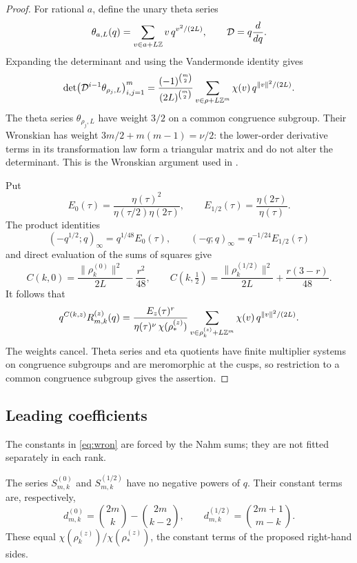 \begin{proof}
For rational $a$, define the unary theta series
\[
\theta_{a,L}(q)=\sum_{v\in a+L\mathbb{Z}}v\,q^{v^2/(2L)},\qquad \mathcal D=q\frac{d}{dq}.
\]
Expanding the determinant and using the Vandermonde identity gives
\[
\det\bigl(\mathcal D^{i-1}\theta_{\rho_j,L}\bigr)_{i,j=1}^m=\frac{(-1)^{\binom m2}}{(2L)^{\binom m2}}\sum_{v\in\rho+L\mathbb{Z}^m}\chi(v)\,q^{\|v\|^2/(2L)}.
\]
The theta series $\theta_{\rho_j,L}$ have weight $3/2$ on a common congruence subgroup. Their Wronskian has weight $3m/2+m(m-1)=\nu/2$: the lower-order derivative terms in its transformation law form a triangular matrix and do not alter the determinant. This is the Wronskian argument used in \cite{MW24,CTW26}.

Put
\[
E_0(\tau)=\frac{\eta(\tau)^2}{\eta(\tau/2)\eta(2\tau)},\qquad E_{1/2}(\tau)=\frac{\eta(2\tau)}{\eta(\tau)}.
\]
The product identities
\[
(-q^{1/2};q)_\infty=q^{1/48}E_0(\tau),\qquad (-q;q)_\infty=q^{-1/24}E_{1/2}(\tau)
\]
and direct evaluation of the sums of squares give
\[
C(k,0)=\frac{\|\rho^{(0)}_k\|^2}{2L}-\frac{r^2}{48},\qquad
C(k,\tfrac12)=\frac{\|\rho^{(1/2)}_k\|^2}{2L}+\frac{r(3-r)}{48}.
\]
It follows that
\[
q^{C(k,z)}R^{(z)}_{m,k}(q)=\frac{E_z(\tau)^r}{\eta(\tau)^\nu\,\chi(\rho^{(z)}_*)}\sum_{v\in\rho^{(z)}_k+L\mathbb{Z}^m}\chi(v)\,q^{\|v\|^2/(2L)}.
\]
The weights cancel. Theta series and eta quotients have finite multiplier systems on congruence subgroups and are meromorphic at the cusps, so restriction to a common congruence subgroup gives the assertion.
\end{proof}

\subsection{Leading coefficients}
The constants in \eqref{eq:wron} are forced by the Nahm sums; they are not fitted separately in each rank.

\begin{proposition}\label{prop:leading}
The series $S^{(0)}_{m,k}$ and $S^{(1/2)}_{m,k}$ have no negative powers of $q$. Their constant terms are, respectively,
\[
d^{(0)}_{m,k}=\binom{2m}{k}-\binom{2m}{k-2},\qquad d^{(1/2)}_{m,k}=\binom{2m+1}{m-k}.
\]
These equal $\chi(\rho^{(z)}_k)/\chi(\rho^{(z)}_*)$, the constant terms of the proposed right-hand sides.
\end{proposition}

